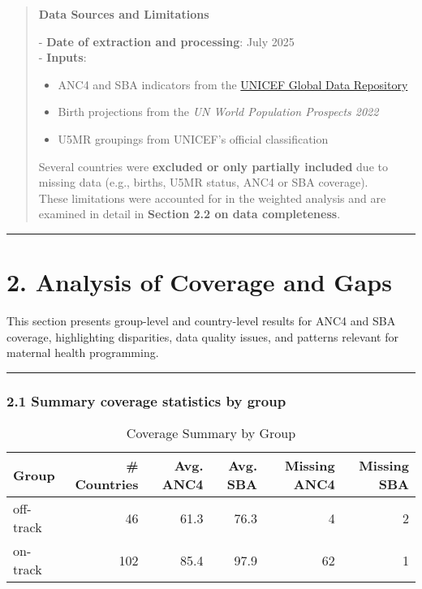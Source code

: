 \documentclass[
]{article}
\begin{document}
\begin{quote}
\textbf{Data Sources and Limitations}

\hfill\break
- \textbf{Date of extraction and processing}: July 2025\\
- \textbf{Inputs}:

\begin{itemize}
\item
  ANC4 and SBA indicators from the
  \href{https://data.unicef.org/resources/data_explorer/unicef_f/?ag=UNICEF&df=GLOBAL_DATAFLOW&ver=1.0&dq=.MNCH_ANC4+MNCH_SAB.&startPeriod=2018&endPeriod=2022}{UNICEF
  Global Data Repository}
\item
  Birth projections from the \emph{UN World Population Prospects 2022}
\item
  U5MR groupings from UNICEF's official classification
\end{itemize}

Several countries were \textbf{excluded or only partially included} due
to missing data (e.g., births, U5MR status, ANC4 or SBA coverage).\\
These limitations were accounted for in the weighted analysis and are
examined in detail in \textbf{Section 2.2 on data completeness}.
\end{quote}

\begin{center}\rule{0.5\linewidth}{0.5pt}\end{center}

\section{2. Analysis of Coverage and
Gaps}\label{analysis-of-coverage-and-gaps}

This section presents group-level and country-level results for ANC4 and
SBA coverage, highlighting disparities, data quality issues, and
patterns relevant for maternal health programming.

\begin{center}\rule{0.5\linewidth}{0.5pt}\end{center}

\subsubsection{2.1 Summary coverage statistics by
group}\label{summary-coverage-statistics-by-group}

\begin{longtable}[t]{lrrrrr}
\caption{\label{tab:unnamed-chunk-1}Coverage Summary by Group}\\
\toprule
Group & \# Countries & Avg. ANC4 & Avg. SBA & Missing ANC4 & Missing SBA\\
\midrule
off-track & 46 & 61.3 & 76.3 & 4 & 2\\
on-track & 102 & 85.4 & 97.9 & 62 & 1\\
\bottomrule
\end{longtable}
\end{document}
